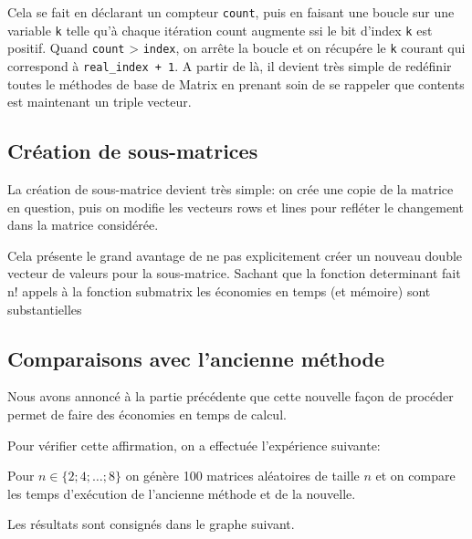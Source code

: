 \documentclass[a4paper,11pt]{article}
\begin{document}
Cela se fait en déclarant un compteur \texttt{count}, puis en faisant une boucle sur une variable \texttt{k} telle qu'à chaque itération count augmente ssi le bit d'index \texttt{k} est positif. Quand \texttt{count} > \texttt{index}, on arrête la boucle
et on récupére le \texttt{k} courant qui correspond à \texttt{real\_index + 1}. 
A partir de là, il devient très simple de redéfinir toutes le méthodes de base de Matrix en prenant soin de se rappeler que contents est maintenant un triple vecteur.

\subsection{Création de sous-matrices}

La création de sous-matrice devient très simple: on crée une copie de la matrice en question, puis on modifie les vecteurs rows et lines pour refléter le changement dans la matrice considérée.

Cela présente le grand avantage de ne pas explicitement créer un nouveau double vecteur de valeurs pour la sous-matrice. Sachant que la fonction determinant fait n! appels à la fonction submatrix les économies en temps (et mémoire) sont substantielles


\subsection{Comparaisons avec l'ancienne méthode}

Nous avons annoncé à la partie précédente que cette nouvelle façon de procéder permet de faire des économies en temps de calcul.

Pour vérifier cette affirmation, on a effectuée l'expérience suivante:

Pour $n \in \{2;4;\dots;8\}$ on génère 100 matrices aléatoires de taille $n$ et on compare les temps d'exécution de l'ancienne méthode et de la nouvelle.

Les résultats sont consignés dans le graphe suivant.
\end{document}
